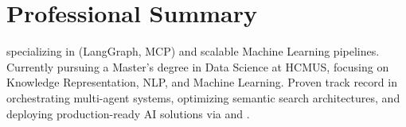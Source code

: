 \section{Professional Summary}
 specializing in  (LangGraph, MCP) and scalable Machine Learning pipelines. Currently pursuing a Master's degree in Data Science at HCMUS, focusing on Knowledge Representation, NLP, and Machine Learning. Proven track record in orchestrating multi-agent systems, optimizing semantic search architectures, and deploying production-ready AI solutions via  and .
